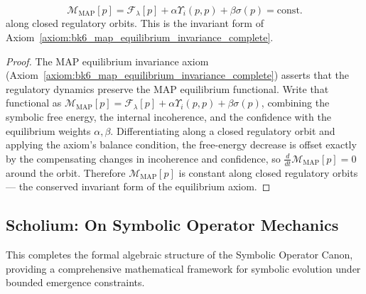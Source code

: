 \begin{proposition}
\label{proposition:bk6_map_invariant}
\begin{equation}
\mathcal{M}_{\text{MAP}}[p] = \mathcal{F}_\lambda[p] + \alpha \Upsilon_i(p,p) + \beta \sigma(p) = \text{const.}
\end{equation}
along closed regulatory orbits.
This is the invariant form of Axiom~\ref{axiom:bk6_map_equilibrium_invariance_complete}.
\end{proposition}
\begin{proof}
\label{proof:bk6_map_invariant}
\leavevmode
The MAP equilibrium invariance axiom (Axiom~\ref{axiom:bk6_map_equilibrium_invariance_complete}) asserts that the regulatory dynamics preserve the MAP equilibrium functional. Write that functional as $\mathcal{M}_{\text{MAP}}[p]=\mathcal{F}_\lambda[p]+\alpha\Upsilon_i(p,p)+\beta\sigma(p)$, combining the symbolic free energy, the internal incoherence, and the confidence with the equilibrium weights $\alpha,\beta$. Differentiating along a closed regulatory orbit and applying the axiom's balance condition, the free-energy decrease is offset exactly by the compensating changes in incoherence and confidence, so $\tfrac{d}{dt}\mathcal{M}_{\text{MAP}}[p]=0$ around the orbit. Therefore $\mathcal{M}_{\text{MAP}}[p]$ is constant along closed regulatory orbits --- the conserved invariant form of the equilibrium axiom.
\end{proof}
\subsection{Scholium: On Symbolic Operator Mechanics}
\label{subsec:bk6_scholium_on_symbolic_operator_mechanics}
This completes the formal algebraic structure of the Symbolic Operator Canon, providing a comprehensive mathematical framework for symbolic evolution under bounded emergence constraints.

